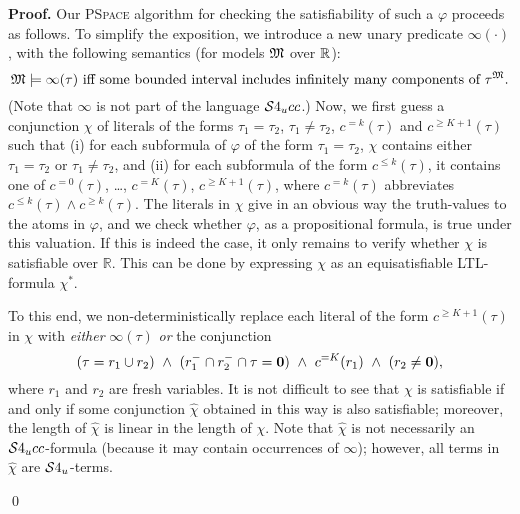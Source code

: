 \documentclass{LMCS}
\renewenvironment{proof}{\par\noindent\textbf{Proof.}}{\mbox{}\qed\par\medskip}
\theoremstyle{plain}
\newcommand{\tc}[2][]{#2^{-_{#1}}}
\newcommand{\PSpace}{\textsc{PSpace}}
\begin{document}
\begin{proof}
Our
\PSpace{} algorithm for checking the satisfiability of such a $\varphi$
proceeds as follows. To simplify the exposition, we
introduce a new unary predicate $\infty(\cdot)$, with the following
semantics (for models $\mathfrak{M}$ over $\mathbb{R}$):
\begin{equation*}
\mathfrak{M} \models \infty(\tau) \mbox{ iff }
\text{some bounded interval includes infinitely many components of $\tau^{\mathfrak{M}}$.}
\end{equation*}
(Note that $\infty$ is not part of the language $\mathcal{S}4_u{}cc$.)
Now,
we first guess a conjunction $\chi$ of literals
of the forms $\tau_1 = \tau_2$, $\tau_1 \ne \tau_2$, $c^{= k}(\tau)$
and $c^{\geq K+1}(\tau)$ such that (i) for each subformula of
$\varphi$ of the form $\tau_1=\tau_2$, $\chi$ contains either
$\tau_1=\tau_2$ or $\tau_1\ne\tau_2$, and (ii) for each subformula of
the form $c^{\leq k}(\tau)$, it contains one of $c^{=0}(\tau)$, \dots,
$c^{=K}(\tau)$, $c^{\geq K+1}(\tau)$, where $c^{= k}(\tau)$
abbreviates $c^{\leq k}(\tau) \land c^{\geq k}(\tau)$. The literals in
$\chi$ give in an obvious way the truth-values to the atoms in
$\varphi$, and we check whether $\varphi$, as a propositional formula,
is true under this valuation. If this is indeed the case, it only
remains to verify whether $\chi$ is satisfiable over $\mathbb R$. This
can be done by expressing $\chi$ as an equisatisfiable LTL-formula
$\chi^*$.

To this end, we non-deterministically replace each literal of the form
$c^{\geq K + 1}(\tau)$ in $\chi$ with {\em either} $\infty(\tau)$ {\em
  or} the conjunction
\begin{equation*}
(\tau = r_1 \cup r_2) \  \land \  (\tc{r_1} \cap \tc{r_2} \cap \tau = \zero) \  \land \
     c^{=K}(r_1) \  \land \   (r_2 \neq \zero),
\end{equation*}
where $r_1$ and $r_2$ are fresh variables. It is not difficult to see
that $\chi$ is satisfiable if and only if some conjunction
$\hat{\chi}$ obtained in this way is also satisfiable; moreover, the
length of $\hat{\chi}$ is linear in the length of $\chi$.  Note that
$\hat{\chi}$ is not necessarily an $\mathcal{S}4_u{}cc$-formula (because it may
contain occurrences of $\infty$); however, all terms in $\hat{\chi}$
are $\mathcal{S}4_u$-terms.


\end{proof}
\end{document}
